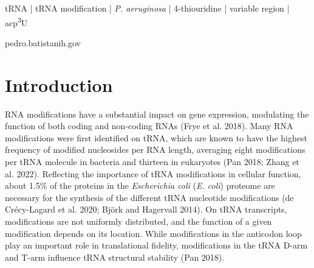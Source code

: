 \documentclass[times, twoside]{zHenriquesLab-StyleBioRxiv}
\begin{document}
\begin{keywords}
tRNA | tRNA modification | \textit{P. aeruginosa} | 4-thiouridine | variable region | acp\textsuperscript{3}U
\end{keywords}

\begin{corrauthor}
pedro.batista\at nih.gov
\end{corrauthor}

\section*{Introduction}
RNA modifications have a substantial impact on gene expression, modulating the function of both coding and non-coding RNAs (Frye et al. 2018). Many RNA modifications were first identified on tRNA, which are known to have the highest frequency of modified nucleosides per RNA length, averaging eight modifications per tRNA molecule in bacteria and thirteen in eukaryotes (Pan 2018; Zhang et al. 2022). Reflecting the importance of tRNA modifications in cellular function, about 1.5\% of the proteins in the \textit{Escherichia coli} (\textit{E. coli}) proteome are necessary for the synthesis of the different tRNA nucleotide modifications (de Crécy-Lagard et al. 2020; Björk and Hagervall 2014). On tRNA transcripts, modifications are not uniformly distributed, and the function of a given modification depends on its location. While modifications in the anticodon loop play an important role in translational fidelity, modifications in the tRNA D-arm and T-arm influence tRNA structural stability (Pan 2018). 
\end{document}
